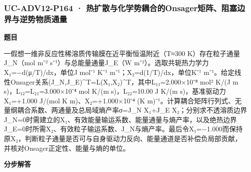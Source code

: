 \documentclass[UTF8,11pt,a4paper]{ctexart}
\begin{document}
\subsubsection*{UC-ADV12-P164 · 热扩散与化学势耦合的Onsager矩阵、阻塞边界与逆势物质通量}
\noindent\textbf{题目}\par
一假想一维非反应性稀溶质传输膜在近平衡恒温附近（T≈300 K）存在粒子通量J\_N（mol m⁻² s⁻¹）与总能量通量J\_E（W m⁻²）。选取共轭热力学力X₁=−d(μ/T)/dx，单位J mol⁻¹ K⁻¹ m⁻¹；X₂=d(1/T)/dx，单位K⁻¹ m⁻¹。给定线性Onsager关系(J\_N,J\_E)\textasciicircum{}T=L(X₁,X₂)\textasciicircum{}T，其中L₁₁=2.000×10⁻⁸ mol² K/(J m s)，L₁₂=L₂₁=3.000×10⁻⁴ mol K/(m s)，L₂₂=10.00 J K/(m s)，基准驱动力X₁=+1.000 J/(mol K m)、X₂=+1.000×10⁻⁴ (K m)⁻¹。计算耦合矩阵行列式、无量纲耦合系数、两通量及总局域熵产率σ=J\_N X₁+J\_E X₂；分别求不透溶质边界J\_N=0时需建立的X₁、有效能量输运系数、能量通量与熵产率，以及绝热边界J\_E=0时所需X₂、有效粒子输运系数、J\_N与熵产率。最后令X₁=−1.000而保持原X₂，判断粒子通量是否可与自身驱动力反向、能量通道是否补偿负局部贡献，并核对Onsager正定性、能量与熵的单位。\par
\medskip\noindent\textbf{分步解答}
\end{document}
